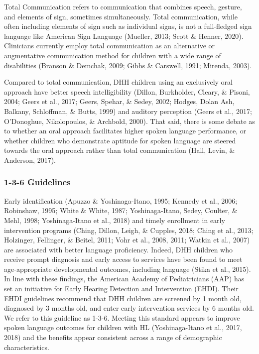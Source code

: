 \documentclass[english,man]{apa6}
\begin{document}
Total Communication refers to communication that combines speech, gesture, and elements of sign, sometimes simultaneously. Total communication, while often including elements of sign such as individual signs, is not a full-fledged sign language like American Sign Language (Mueller, 2013; Scott \& Henner, 2020). Clinicians currently employ total communication as an alternative or augmentative communication method for children with a wide range of disabilities (Branson \& Demchak, 2009; Gibbs \& Carswell, 1991; Mirenda, 2003).

Compared to total communication, DHH children using an exclusively oral approach have better speech intelligibility (Dillon, Burkholder, Cleary, \& Pisoni, 2004; Geers et al., 2017; Geers, Spehar, \& Sedey, 2002; Hodges, Dolan Ash, Balkany, Schloffman, \& Butts, 1999) and auditory perception (Geers et al., 2017; O'Donoghue, Nikolopoulos, \& Archbold, 2000). That said, there is some debate as to whether an oral approach facilitates higher spoken language performance, or whether children who demonstrate aptitude for spoken language are steered towards the oral approach rather than total communication (Hall, Levin, \& Anderson, 2017).

\hypertarget{guidelines}{%
\subsubsection{1-3-6 Guidelines}\label{guidelines}}

Early identification (Apuzzo \& Yoshinaga-Itano, 1995; Kennedy et al., 2006; Robinshaw, 1995; White \& White, 1987; Yoshinaga-Itano, Sedey, Coulter, \& Mehl, 1998; Yoshinaga-Itano et al., 2018) and timely enrollment in early intervention programs (Ching, Dillon, Leigh, \& Cupples, 2018; Ching et al., 2013; Holzinger, Fellinger, \& Beitel, 2011; Vohr et al., 2008, 2011; Watkin et al., 2007) are associated with better language proficiency. Indeed, DHH children who receive prompt diagnosis and early access to services have been found to meet age-appropriate developmental outcomes, including language (Stika et al., 2015).
In line with these findings, the American Academy of Pediatricians (AAP) has set an initiative for Early Hearing Detection and Intervention (EHDI). Their EHDI guidelines recommend that DHH children are screened by 1 month old, diagnosed by 3 months old, and enter early intervention services by 6 months old. We refer to this guideline as 1-3-6. Meeting this standard appears to improve spoken language outcomes for children with HL (Yoshinaga-Itano et al., 2017, 2018) and the benefits appear consistent across a range of demographic characteristics.
\end{document}
